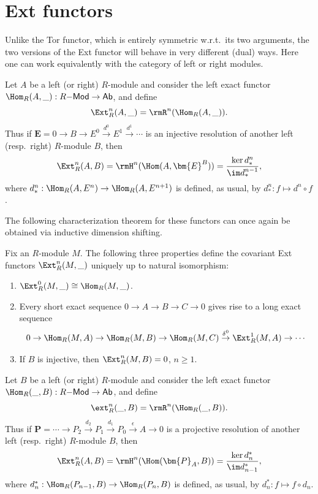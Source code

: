 \section{Ext functors}

Unlike the Tor functor, which is entirely symmetric w.r.t.\ its two arguments, the two versions of the Ext functor will behave in very different (dual) ways. Here one can work equivalently with the category of left or right modules.

\begin{defn}
    Let $A$ be a left (or right) $R$-module and consider the left exact functor $\Hom_R(A,\_):R\mathsf{-Mod}\to \mathsf{Ab}$, and define
    \[\Ext_R^n(A,\_)=\rmR^n(\Hom_R(A,\_)).\]
    Thus if $\bm{E}=0\to B\to E^0\overset{d^0}{\to} E^1\overset{d^1}{\to}\cdots$ is an injective resolution of another left (resp.~right) $R$-module $B$, then
    \[\Ext_R^n(A,B)=\rmH^n(\Hom(A,\bm{E}^B))=\frac{\ker d_\ast^n}{\im d_\ast^{n-1}},\]
    where $d_\ast^n:\Hom_R(A,E^n)\to \Hom_R(A,E^{n+1})$ is defined, as usual, by $d_\ast^n:f\mapsto d^n\circ f$.
\end{defn}

The following characterization theorem for these functors can once again be obtained via inductive dimension shifting.

\begin{thm}
    Fix an $R$-module $M$. The following three properties define the covariant Ext functors $\Ext_R^n(M,\_)$ uniquely up to natural isomorphism:
    \begin{enumerate}
        \item $\Ext^0_R(M,\_)\cong\Hom_R(M,\_)$.
        \item Every short exact sequence $0\to A\to B\to C\to 0$ gives rise to a long exact sequence
        \[0\to \Hom_R(M,A)\to \Hom_R(M,B)\to \Hom_R(M,C)\overset{\delta^0}{\to} \Ext^1_R(M,A)\to\cdots \]
        \item If $B$ is injective, then $\Ext_R^n(M,B)=0$, $n\geq 1$.
    \end{enumerate}
\end{thm}


\begin{defn}
    Let $B$ be a left (or right) $R$-module and consider the left exact functor $\Hom_R(\_,B):R\mathsf{-Mod}\to \mathsf{Ab}$, and define
    \[\ext_R^n(\_,B)=\rmR^n(\Hom_R(\_,B)).\]
    Thus if $\bm{P}=\cdots\to P_2\overset{d_2}\to P_1\overset{d_1}{\to} P_0 \overset{\epsilon}{\to}A\to 0$ is a projective resolution of another left (resp.~right) $R$-module $B$, then
    \[\Ext_R^n(A,B)=\rmH^n(\Hom(\bm{P}_A,B))=\frac{\ker d_n^{\ast}}{\im d_{n-1}^\ast},\]
    where $d_n^{\ast}:\Hom_R(P_{n-1},B)\to \Hom_R(P_n,B)$ is defined, as usual, by $d_n^{\ast}:f\mapsto f\circ d_n$.
\end{defn}

